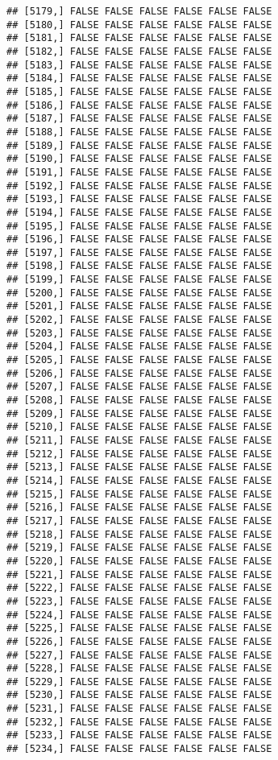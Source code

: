 \documentclass[
]{article}
\begin{document}
\begin{verbatim}
## [5179,] FALSE FALSE FALSE FALSE FALSE FALSE
## [5180,] FALSE FALSE FALSE FALSE FALSE FALSE
## [5181,] FALSE FALSE FALSE FALSE FALSE FALSE
## [5182,] FALSE FALSE FALSE FALSE FALSE FALSE
## [5183,] FALSE FALSE FALSE FALSE FALSE FALSE
## [5184,] FALSE FALSE FALSE FALSE FALSE FALSE
## [5185,] FALSE FALSE FALSE FALSE FALSE FALSE
## [5186,] FALSE FALSE FALSE FALSE FALSE FALSE
## [5187,] FALSE FALSE FALSE FALSE FALSE FALSE
## [5188,] FALSE FALSE FALSE FALSE FALSE FALSE
## [5189,] FALSE FALSE FALSE FALSE FALSE FALSE
## [5190,] FALSE FALSE FALSE FALSE FALSE FALSE
## [5191,] FALSE FALSE FALSE FALSE FALSE FALSE
## [5192,] FALSE FALSE FALSE FALSE FALSE FALSE
## [5193,] FALSE FALSE FALSE FALSE FALSE FALSE
## [5194,] FALSE FALSE FALSE FALSE FALSE FALSE
## [5195,] FALSE FALSE FALSE FALSE FALSE FALSE
## [5196,] FALSE FALSE FALSE FALSE FALSE FALSE
## [5197,] FALSE FALSE FALSE FALSE FALSE FALSE
## [5198,] FALSE FALSE FALSE FALSE FALSE FALSE
## [5199,] FALSE FALSE FALSE FALSE FALSE FALSE
## [5200,] FALSE FALSE FALSE FALSE FALSE FALSE
## [5201,] FALSE FALSE FALSE FALSE FALSE FALSE
## [5202,] FALSE FALSE FALSE FALSE FALSE FALSE
## [5203,] FALSE FALSE FALSE FALSE FALSE FALSE
## [5204,] FALSE FALSE FALSE FALSE FALSE FALSE
## [5205,] FALSE FALSE FALSE FALSE FALSE FALSE
## [5206,] FALSE FALSE FALSE FALSE FALSE FALSE
## [5207,] FALSE FALSE FALSE FALSE FALSE FALSE
## [5208,] FALSE FALSE FALSE FALSE FALSE FALSE
## [5209,] FALSE FALSE FALSE FALSE FALSE FALSE
## [5210,] FALSE FALSE FALSE FALSE FALSE FALSE
## [5211,] FALSE FALSE FALSE FALSE FALSE FALSE
## [5212,] FALSE FALSE FALSE FALSE FALSE FALSE
## [5213,] FALSE FALSE FALSE FALSE FALSE FALSE
## [5214,] FALSE FALSE FALSE FALSE FALSE FALSE
## [5215,] FALSE FALSE FALSE FALSE FALSE FALSE
## [5216,] FALSE FALSE FALSE FALSE FALSE FALSE
## [5217,] FALSE FALSE FALSE FALSE FALSE FALSE
## [5218,] FALSE FALSE FALSE FALSE FALSE FALSE
## [5219,] FALSE FALSE FALSE FALSE FALSE FALSE
## [5220,] FALSE FALSE FALSE FALSE FALSE FALSE
## [5221,] FALSE FALSE FALSE FALSE FALSE FALSE
## [5222,] FALSE FALSE FALSE FALSE FALSE FALSE
## [5223,] FALSE FALSE FALSE FALSE FALSE FALSE
## [5224,] FALSE FALSE FALSE FALSE FALSE FALSE
## [5225,] FALSE FALSE FALSE FALSE FALSE FALSE
## [5226,] FALSE FALSE FALSE FALSE FALSE FALSE
## [5227,] FALSE FALSE FALSE FALSE FALSE FALSE
## [5228,] FALSE FALSE FALSE FALSE FALSE FALSE
## [5229,] FALSE FALSE FALSE FALSE FALSE FALSE
## [5230,] FALSE FALSE FALSE FALSE FALSE FALSE
## [5231,] FALSE FALSE FALSE FALSE FALSE FALSE
## [5232,] FALSE FALSE FALSE FALSE FALSE FALSE
## [5233,] FALSE FALSE FALSE FALSE FALSE FALSE
## [5234,] FALSE FALSE FALSE FALSE FALSE FALSE

\end{verbatim}
\end{document}
